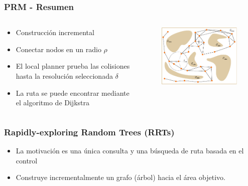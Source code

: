 \begin{frame}
	\frametitle{PRM - Resumen}
	
	\begin{columns}
		\begin{column}{0.5\textwidth}
			\begin{itemize}
				\item Construcción incremental
				\item Conectar nodos en un radio $\rho$
				\item El local planner prueba las colisiones hasta la resolución seleccionada $\delta$
				\item La ruta se puede encontrar mediante el algoritmo de Dijkstra
			\end{itemize}
		\end{column}
		\begin{column}{0.5\textwidth}  %
			\begin{figure}[!h]
				\includegraphics[width=\columnwidth]{images/prm_summary.pdf}
			\end{figure}
		\end{column}
	\end{columns}
	
\end{frame}

\begin{frame}
	\frametitle{Rapidly-exploring Random Trees (RRTs)}
	
	\begin{itemize}
		\item La motivación es una única consulta y una búsqueda de ruta basada en el control
		\item Construye incrementalmente un grafo (árbol) hacia el área objetivo.
	\end{itemize}
	
\end{frame}

